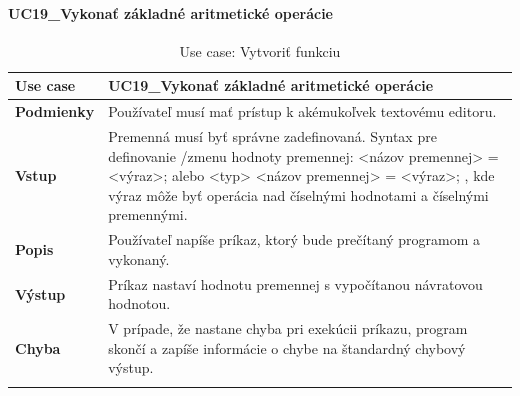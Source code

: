 \paragraph{UC19\_Vykonať základné aritmetické operácie}
\begin{center}
	\begin{longtable}{|p{2.5cm}|p{12.2cm}|}
		
			\hline
			\textbf{Use case} & UC19\_Vykonať základné aritmetické operácie \\ 
			\hline
			\textbf{Podmienky} & Používateľ musí mať prístup k akémukoľvek textovému editoru.  \\ 
			\hline
			\textbf{Vstup} & Premenná musí byť správne zadefinovaná. 
			\newline
			Syntax pre definovanie /zmenu hodnoty premennej: 
			\newline
			<názov premennej> = <výraz>; alebo 
			\newline
			<typ> <názov premennej> = <výraz>;
			\newline
			, kde výraz môže byť operácia nad číselnými hodnotami a číselnými premennými. \\
			\hline
			\textbf{Popis} & Používateľ napíše príkaz, ktorý bude prečítaný programom a vykonaný.\\ 
			\hline
			\textbf{Výstup} & Príkaz nastaví hodnotu premennej s vypočítanou návratovou hodnotou.\\
			\hline
			\textbf{Chyba} & V prípade, že nastane chyba pri exekúcii príkazu, program skončí a zapíše informácie o chybe na štandardný chybový výstup.\\
			\hline
		\caption{Use case: Vytvoriť funkciu}
		\label{table:1}
		
	\end{longtable}
\end{center}

